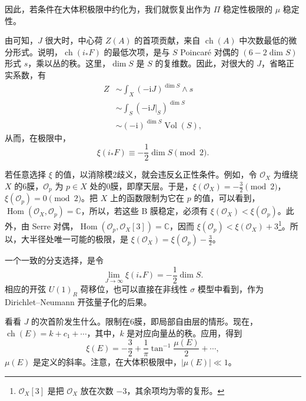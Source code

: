 因此，若条件在大体积极限中约化为，我们就恢复出作为 $\Pi$ 稳定性极限的 $\mu$ 稳定性。

由可知，$J$ 很大时，中心荷 $Z(A)$ 的首项贡献，来自 $\operatorname{ch}(A)$ 中次数最低的微分形式。说明，$\operatorname{ch}(i_*F)$ 的最低次项，是与 $S$ Poincar\'e 对偶的 $(6-2\dim S)$ 形式 $s$，乘以丛的秩。这里，$\dim S$ 是 $S$ 的复维数。因此，对很大的 $J$，省略正实系数，有
\begin{equation}\label{eq:5.140}
\begin{aligned}
Z&\sim\int_X(-\mathrm{i}J)^{\dim S}\wedge s\\
&\sim\int_S(-\mathrm{i}J|_S)^{\dim S}\\
&\sim(-\mathrm{i})^{\dim S}\operatorname{Vol}(S),
\end{aligned}
\end{equation}
从而，在极限中，
\begin{equation}\label{eq:5.141}
\xi(i_*F)\equiv-\frac12\dim S\pmod2.
\end{equation}

若任意选择 $\xi$ 的值，以消除模2歧义，就会违反幺正性条件。例如，令 $\mathcal{O}_X$ 为缠绕 $X$ 的6膜，$\mathcal{O}_p$ 为 $p\in X$ 处的0膜，即摩天层。于是，$\xi(\mathcal{O}_X)=-\tfrac32\pmod2$，$\xi(\mathcal{O}_p)=0\pmod2$。把 $X$ 上的函数限制为它在 $p$ 的值，可以看到，$\operatorname{Hom}(\mathcal{O}_X,\mathcal{O}_p)=\mathbb{C}$，所以，若这些 B 膜稳定，必须有 $\xi(\mathcal{O}_X)<\xi(\mathcal{O}_p)$。此外，由 Serre 对偶，$\operatorname{Hom}(\mathcal{O}_p,\mathcal{O}_X[3])=\mathbb{C}$，因而 $\xi(\mathcal{O}_p)<\xi(\mathcal{O}_X)+3$\footnote{$\mathcal{O}_X[3]$ 是把 $\mathcal{O}_X$ 放在次数 $-3$，其余项均为零的复形。}。所以，大半径处唯一可能的极限，是 $\xi(\mathcal{O}_X)=\xi(\mathcal{O}_p)-\tfrac32$。

一个一致的分支选择，是令
\begin{equation}\label{eq:5.142}
\lim_{J\to\infty}\xi(i_*F)=-\frac12\dim S.
\end{equation}
相应的开弦 $U(1)_R$ 荷移位，也可以直接在非线性 $\sigma$ 模型中看到，作为 Dirichlet--Neumann 开弦量子化的后果。

看看 $J$ 的次首阶发生什么。限制在6膜，即局部自由层的情形。现在，$\operatorname{ch}(E)=k+c_1+\cdots$，其中，$k$ 是对应向量丛的秩。应用，得到
\begin{equation}\label{eq:5.143}
\xi(E)=-\frac32+\frac1\pi\tan^{-1}\frac{\mu(E)}{2}+\cdots,
\end{equation}
$\mu(E)$ 是定义的斜率。注意，在大体积极限中，$|\mu(E)|\ll1$。

